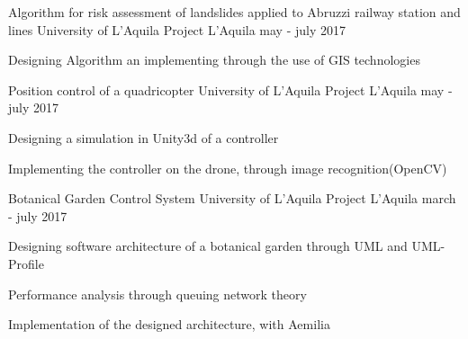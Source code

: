


\begin{cventries}



\cventry
{Algorithm for risk assessment of landslides applied to Abruzzi railway station and lines}%
{University of L'Aquila Project} %
{L'Aquila} %
{may - july 2017} %
{ %
	\begin{cvitems}
		\item {Designing Algorithm an implementing through the use of GIS technologies}
	\end{cvitems}
}

\cventry
{Position control of a quadricopter}%
{University of L'Aquila Project} %
{L'Aquila} %
{may - july 2017} %
{ %
	\begin{cvitems}
		\item {Designing a simulation in Unity3d of a controller}
		\item {Implementing the controller on the drone, through image recognition(OpenCV)}
	\end{cvitems}
}

\cventry
{Botanical Garden Control System} %
{University of L'Aquila Project} %
{L'Aquila} %
{march - july 2017} %
{ %
	\begin{cvitems}
		\item {Designing software architecture of a botanical garden through UML and UML-Profile}
		\item {Performance analysis through queuing network theory}
		\item {Implementation of the designed architecture, with Aemilia}
	\end{cvitems}
}


\end{cventries}
